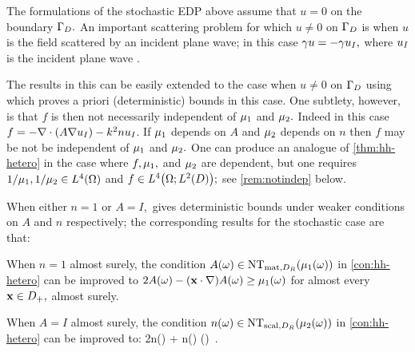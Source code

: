 \label{rem:planewave}
The formulations of the stochastic EDP above assume that $u=0$ on the boundary $\Gamma_{D}.$ An important scattering problem for which $u \neq 0$ on $\Gamma_{D}$ is when $u$ is the field scattered by an incident plane wave; in this case $\gamma u = -\gamma u_{I},$ where $u_{I}$ is the incident plane wave \cite[p. 107]{ChGrLaSp:12}.

The results in this  can be easily extended to the case when $u\neq0$ on $\Gamma_{D}$ using \cite[Theorem 2.19(ii)]{GrPeSp:19}  which proves a priori (deterministic) bounds in this case. One subtlety, however, is that $f$ is then not necessarily independent of $\mu_{1}$ and $\mu_{2}.$ Indeed in this case
$f = -\grad\cdot\mleft(A\grad \uI\mright) - k^2n\uI$.
If $\mu_{1}$ depends on $A$ and $\mu_{2}$ depends on $n$ then %
$f$ may be not be independent of $\mu_{1}$ and $\mu_{2}.$ One can produce an analogue of \cref{thm:hh-hetero} in the case where $f,\mu_{1},$ and $\mu_{2}$ are dependent, but one requires $1/\muo, 1/\mut \in \LfO$ and $f \in \LfOLtD;$ see \cref{rem:notindep} below.
\ere

\bre[The case when either $n=1$ or $A=I$]\label{rem:ones}
When either $n=1$ or $A=I,$ \cite[Theorem 2.19]{GrPeSp:19} gives deterministic bounds under weaker conditions on $A$ and $n$ respectively; the corresponding results for the stochastic case are that:

\bit
\item 

When $n=1$  almost surely, the condition $A(\omega) \in \NTA{\muo(\omega)}$ in \cref{con:hh-hetero} can be improved to
$2A(\omega) - \mleft(\bx \cdot \nabla \mright)A(\omega) \geq \muo(\omega)$
for almost every $\mathbf{x}\in D_{+},$ almost surely.

\item When $A=I$ almost surely, the condition $n(\omega) \in \NTn{\mut(\omega)}$ in \cref{con:hh-hetero} can be improved to:
\beq\label{eq:nimproved}
2n(\omega) + \bx \cdot \nabla n(\omega) \geq \mut(\omega) \,.
\eeq
\eit
\ere


